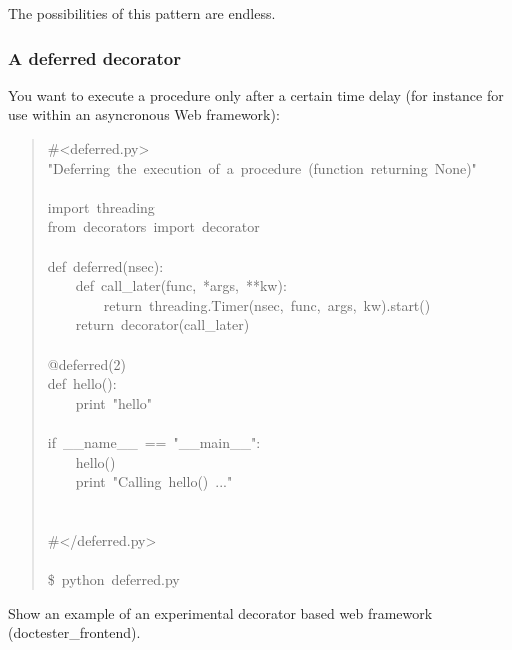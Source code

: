 \documentclass[10pt,a4paper,english]{article}
\begin{document}
The possibilities of this pattern are endless.



\hypertarget{a-deferred-decorator}{}
\subsubsection*{A deferred decorator}

You want to execute a procedure only after a certain time delay (for instance
for use within an asyncronous Web framework):
\begin{quote}{\ttfamily \raggedright \noindent
{\#}<deferred.py>~\\
"Deferring~the~execution~of~a~procedure~(function~returning~None)"~\\
~\\
import~threading~\\
from~decorators~import~decorator~\\
~\\
def~deferred(nsec):~\\
~~~~def~call{\_}later(func,~*args,~**kw):~\\
~~~~~~~~return~threading.Timer(nsec,~func,~args,~kw).start()~\\
~~~~return~decorator(call{\_}later)~\\
~\\
@deferred(2)~\\
def~hello():~\\
~~~~print~"hello"~\\
~\\
if~{\_}{\_}name{\_}{\_}~==~"{\_}{\_}main{\_}{\_}":~\\
~~~~hello()~~~~~\\
~~~~print~"Calling~hello()~..."~\\
~~~~\\
~\\
{\#}</deferred.py>~\\
~\\
{\$}~python~deferred.py
}\end{quote}

Show an example of an experimental decorator based web framework
(doctester{\_}frontend).



\hypertarget{part-ii-metaclasses}{}
\end{document}
